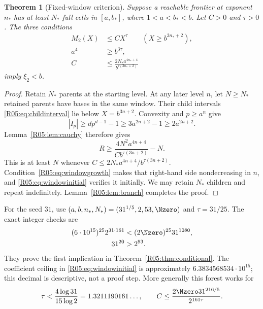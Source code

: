 \documentclass[11pt,a4paper]{article}
\newtheorem{theorem}{Theorem}[section]
\theoremstyle{definition}\newtheorem{definition}[theorem]{Definition}
\theoremstyle{remark}\newtheorem{remark}[theorem]{Remark}
\begin{document}
\begin{theorem}[Fixed-window criterion]\label{R05:thm:window}
Suppose a reachable frontier at exponent $n_*$ has at least $N_*$
full cells in $[a,b_*]$, where $1<a<b_*<b$.
Let $C>0$ and $\tau>0$. The three conditions
\begin{align}
 M_2(X)&\le C X^\tau\qquad(X\ge b^{3n_*+2}),\label{R05:eq:windowH}\\
 a^4&\ge b^{3\tau},\label{R05:eq:windowgrowth}\\
 C&\le\frac{2N_*a^{4n_*+4}}{b^{\tau(3n_*+2)}}\label{R05:eq:windowinitial}
\end{align}
imply $\xi_2<b$.
\end{theorem}
\begin{proof}
Retain $N_*$ parents at the starting level. At any later level $n$,
let $N\ge N_*$ retained parents have bases in the same window.
Their child intervals \eqref{R05:eq:childinterval} lie below
$X=b^{3n+2}$. Convexity and $p\ge a^n$ give
\begin{equation}\label{R05:eq:length}
 |I_p|\ge d p^{d-1}-1
 \ge3a^{2n+2}-1\ge2a^{2n+2}.
\end{equation}
Lemma~\ref{R05:lem:cauchy} therefore gives
\[
 R\ge\frac{4N^2a^{4n+4}}{C b^{\tau(3n+2)}}-N.
\]
This is at least $N$ whenever
$C\le2N_*a^{4n+4}/b^{\tau(3n+2)}$.
Condition~\eqref{R05:eq:windowgrowth} makes that right-hand side
nondecreasing in $n$, and \eqref{R05:eq:windowinitial} verifies it initially.
We may retain $N_*$ children and repeat indefinitely.
Lemma~\ref{R05:lem:branch} completes the proof.
\end{proof}

For the seed $31$, use $(a,b,n_*,N_*)=(31^{1/5},2,53,\Nzero)$ and
$\tau=31/25$. The exact integer checks are
\begin{equation}\label{R05:eq:smallchecks}
 \begin{aligned}
 (6\cdot10^{15})^{25}2^{31\cdot161}
   &<(2\Nzero)^{25}31^{1080},\\
 31^{20}&>2^{93}.
 \end{aligned}
\end{equation}
They prove the first implication in Theorem~\ref{R05:thm:conditional}.
The coefficient ceiling in \eqref{R05:eq:windowinitial} is approximately
$6.3834568534\cdot10^{15}$; this decimal is descriptive, not a proof step.
More generally this forest works for
\[
 \tau<\frac{4\log31}{15\log2}=1.3211190161\ldots,
 \qquad C\le\frac{2\Nzero31^{216/5}}{2^{161\tau}}.
\]
\end{document}
